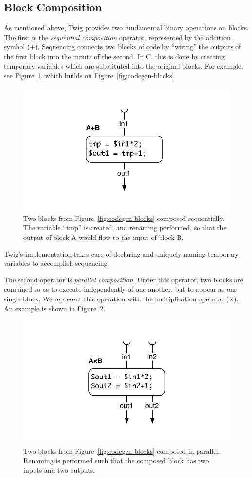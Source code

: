 \subsection{Block Composition}

As mentioned above, Twig provides two fundamental binary operations on blocks.
The first is the \emph{sequential composition} operator, represented by the
addition symbol ($+$). Sequencing connects two blocks of code by ``wiring'' the
outputs of the first block into the inputs of the second. In C, this is done by
creating temporary variables which are substituted into the original blocks. For
example, see Figure~\ref{fig:codegen-seq}, which builds on
Figure~\ref{fig:codegen-blocks}.

\begin{figure}[ht]
\centering
\includegraphics[width=0.75\columnwidth]{images/code-gen2}
\caption{Two blocks from Figure~\ref{fig:codegen-blocks} composed sequentially.
The variable ``tmp'' is created, and renaming performed, so that the output of
block A would flow to the input of block B.}
\label{fig:codegen-seq}
\end{figure}

Twig's implementation takes care of declaring and uniquely naming
temporary variables to accomplish sequencing.

The second operator is \emph{parallel composition}. Under this operator, two
blocks are combined so as to execute independently of one another, but to appear
as one single block. We represent this operation with the multiplication
operator ($\times$). An example is shown in Figure~\ref{fig:codegen-par}.

\begin{figure}[ht]
\centering
\includegraphics[width=0.75\columnwidth]{images/code-gen3}
\caption{Two blocks from Figure~\ref{fig:codegen-blocks} composed in parallel.
Renaming is performed such that the composed block has two inputs and two 
outputs.}
\label{fig:codegen-par}
\end{figure}

